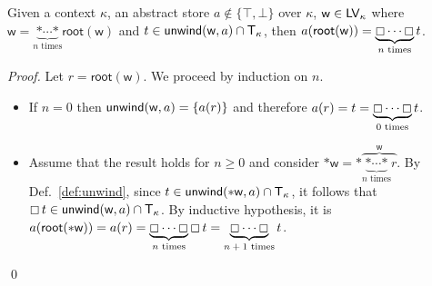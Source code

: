 \begin{lemma}\label{lem:unwind_types}
  Given a context $\kappa$, an abstract store $a\not\in\{\top,\bot\}$ over $\kappa$,
  $\mathsf{w}\in\mathsf{LV}_\kappa$
  where $\mathsf{w}=\underbrace{\mathtt{*}\cdots\mathtt{*}}_{\text{$n$ times}}\mathsf{root}(\mathsf{w})$
  and $t\in\mathsf{unwind}(\mathsf{w},a)\cap\mathsf{T}_\kappa$, then
  $a(\mathsf{root}(\mathsf{w}))=\underbrace{\boxempty\cdots\boxempty}_\text{$n$ times}t$.
\end{lemma}
\begin{proof}
  Let $r=\mathsf{root}(\mathsf{w})$. We proceed by induction on $n$.
  \begin{itemize}
  \item If $n=0$ then $\mathsf{unwind}(\mathsf{w},a)=\{a(r)\}$ and therefore
    $a(r)=t=\underbrace{\boxempty\cdots\boxempty}_\text{$0$ times}t$.
  \item Assume that the result holds for $n\ge 0$ and consider
    $\mathtt{*}\mathsf{w}=\mathtt{*}\overbrace{\underbrace{\mathtt{*}\cdots\mathtt{*}}_{\text{$n$ times}} r}^\mathsf{w}$.
    By Def.~\ref{def:unwind},
    since $t\in\mathsf{unwind}(\mathtt{*}\mathsf{w},a)\cap\mathsf{T}_\kappa$, it follows that
    $\boxempty\,{t}\in\mathsf{unwind}(\mathsf{w},a)\cap\mathsf{T}_\kappa$.
    By inductive hypothesis, it is
    $a(\mathsf{root}(\mathtt{*}\mathsf{w}))=a(r)=\underbrace{\boxempty\cdots\boxempty}_\text{$n$ times}\boxempty\,{t}
    =\underbrace{\boxempty\cdots\boxempty}_\text{$n+1$ times}t$.
  \end{itemize}
  \qed
\end{proof}

